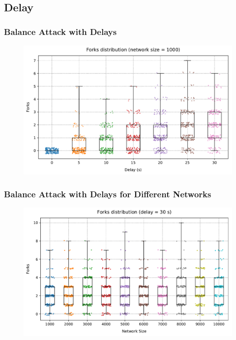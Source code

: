 \documentclass[pdf]{beamer}
\begin{document}
\subsection{Delay}
\begin{frame}
	\frametitle{Balance Attack with Delays}
	\begin{figure}
		\centering
		\includegraphics[width=\columnwidth]{plots/forks_attack_delay_1000_boxplot_1}
	\end{figure}
\end{frame}
\begin{frame}
	\frametitle{Balance Attack with Delays for Different Networks}
	\begin{figure}
		\centering
		\includegraphics[width=\columnwidth]{plots/forks_attack_delay_30_network_sizes_boxplot_1}
	\end{figure}
\end{frame}
\end{document}
